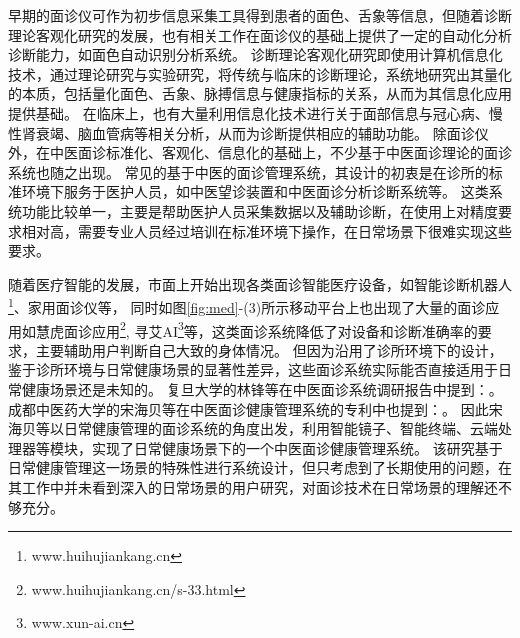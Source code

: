 早期的面诊仪可作为初步信息采集工具得到患者的面色、舌象等信息，但随着诊断理论客观化研究的发展，也有相关工作在面诊仪的基础上提供了一定的自动化分析诊断能力，如面色自动识别分析系统\cite{崔骥2018人工智能背景下中医诊疗技术的应用与展望}。
诊断理论客观化研究即使用计算机信息化技术，通过理论研究与实验研究，将传统与临床的诊断理论，系统地研究出其量化的本质，包括量化面色、舌象、脉搏信息与健康指标的关系，从而为其信息化应用提供基础\cite{Wang2013TCM, guo2015analysis, li2020tcminet}。
在临床上，也有大量利用信息化技术进行关于面部信息与冠心病、慢性肾衰竭、脑血管病等相关分析，从而为诊断提供相应的辅助功能\cite{崔骥2018人工智能背景下中医诊疗技术的应用与展望}。
除面诊仪外，在中医面诊标准化、客观化、信息化的基础上，不少基于中医面诊理论的面诊系统也随之出现。
常见的基于中医的面诊管理系统，其设计的初衷是在诊所的标准环境下服务于医护人员，如中医望诊装置\cite{李国正0一种用于中医望诊的三维图像采集装置}和中医面诊分析诊断系统等\cite{李福凤2016中医面诊分析与诊断系统}。
这类系统功能比较单一，主要是帮助医护人员采集数据以及辅助诊断，在使用上对精度要求相对高，需要专业人员经过培训在标准环境下操作，在日常场景下很难实现这些要求。

随着医疗智能的发展，市面上开始出现各类面诊智能医疗设备，如智能诊断机器人\footnote{www.huihujiankang.cn}、家用面诊仪等，
同时如图\ref{fig:med}-(3)所示移动平台上也出现了大量的面诊应用如慧虎面诊应用\footnote{www.huihujiankang.cn/s-33.html}, 寻艾AI\footnote{www.xun-ai.cn}等，这类面诊系统降低了对设备和诊断准确率的要求，主要辅助用户判断自己大致的身体情况。
但因为沿用了诊所环境下的设计，鉴于诊所环境与日常健康场景的显著性差异，这些面诊系统实际能否直接适用于日常健康场景还是未知的。
复旦大学的林锋\cite{林锋2019中医面诊系统调研报告}等在中医面诊系统调研报告中提到：。
成都中医药大学的宋海贝\cite{宋海贝2019中医面诊健康管理系统}等在中医面诊健康管理系统的专利中也提到：。
因此宋海贝等以日常健康管理的面诊系统的角度出发，利用智能镜子、智能终端、云端处理器等模块，实现了日常健康场景下的一个中医面诊健康管理系统。
该研究基于日常健康管理这一场景的特殊性进行系统设计，但只考虑到了长期使用的问题，在其工作中并未看到深入的日常场景的用户研究，对面诊技术在日常场景的理解还不够充分。

